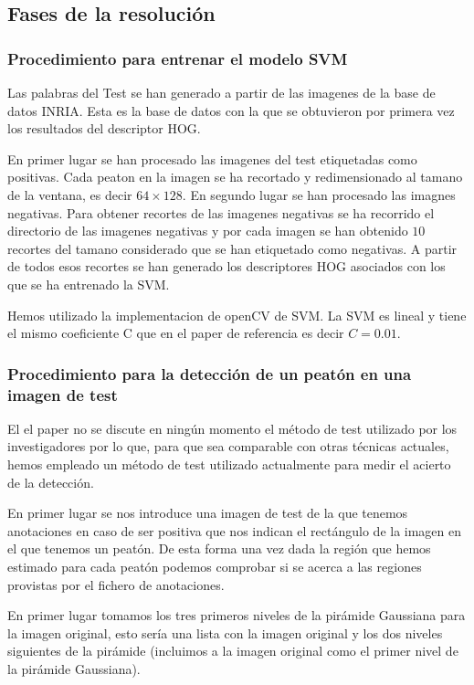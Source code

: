 \documentclass[a4paper,12pt]{article}
\begin{document}
\subsection{Fases de la resolución}


\subsubsection{Procedimiento para entrenar el modelo SVM}

Las palabras del Test se han generado a partir de las imagenes de
la base de datos INRIA. Esta es la base de datos con la que se
obtuvieron por primera vez los resultados del descriptor HOG.

En primer lugar se han procesado las imagenes del test etiquetadas
como positivas. Cada peaton en la imagen se ha recortado y
redimensionado al tamano de la ventana, es decir $64\times 128$.
En segundo lugar se han procesado las imagnes negativas. Para
obtener recortes de las imagenes negativas se ha recorrido el
directorio de las imagenes negativas y por cada imagen se han
obtenido $10$ recortes del tamano considerado que se han etiquetado
como negativas. A partir de todos esos recortes se han generado los
descriptores HOG asociados con los que se ha entrenado la SVM.

Hemos utilizado la implementacion de openCV de SVM. La SVM es
lineal y tiene el mismo coeficiente C que en el paper de referencia
es decir $C = 0.01$. 

\subsubsection{Procedimiento para la detección de un peatón en una imagen de test}

El el paper no se discute en ningún momento el método de test utilizado por los investigadores por lo que, para que sea comparable con otras técnicas actuales, hemos empleado un método de test utilizado actualmente para medir el acierto de la detección.

En primer lugar se nos introduce una imagen de test de la que tenemos anotaciones en caso de ser positiva que nos indican el rectángulo de la imagen en el que tenemos un peatón. De esta forma una vez dada la región que hemos estimado para cada peatón podemos comprobar si se acerca a las regiones provistas por el fichero de anotaciones. 

En primer lugar tomamos los tres primeros niveles de la pirámide Gaussiana para la imagen original, esto sería una lista con la imagen original y los dos niveles siguientes de la pirámide (incluimos a la imagen original como el primer nivel de la pirámide Gaussiana). 
\end{document}
